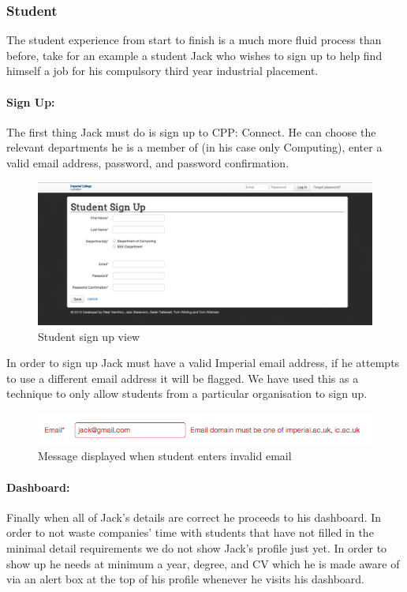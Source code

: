 \subsubsection{Student}
The student experience from start to finish is a much more fluid process than before, take for an example a student Jack who wishes to sign up to help find himself a job for his compulsory third year industrial placement.
  \paragraph{Sign Up:}
    The first thing Jack must do is sign up to CPP: Connect. He can choose the relevant departments he is a member of (in his case only Computing), enter a valid email address, password, and password confirmation.

    \begin{figure}[H]\centering
    \includegraphics[scale=0.3]{images/user_experiences/student/sign_up_page}
    \caption{Student sign up view}
    \end{figure}

    In order to sign up Jack must have a valid Imperial email address, if he attempts to use a different email address it will be flagged. We have used this as a technique to only allow students from a particular organisation to sign up.

    \begin{figure}[H]\centering
    \includegraphics[scale=0.5]{images/user_experiences/student/invalid_email}
    \caption{Message displayed when student enters invalid email}
    \end{figure}

  \paragraph{Dashboard:}
    Finally when all of Jack's details are correct he proceeds to his dashboard. In order to not waste companies' time with students that have not filled in the minimal detail requirements we do not show Jack's profile just yet. In order to show up he needs at minimum a year, degree, and CV which he is made aware of via an alert box at the top of his profile whenever he visits his dashboard.

